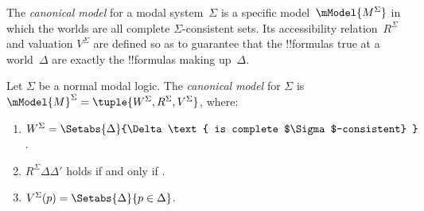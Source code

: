 \documentclass[../../../include/open-logic-section]{subfiles}
\begin{document}


The \emph{canonical model} for a modal system~$\Sigma$ is a specific
model~$\mModel{M^\Sigma}$ in which the worlds are all complete
$\Sigma$-consistent sets. Its accessibility relation~$R^\Sigma$ and
valuation $V^\Sigma$ are defined so as to guarantee that the
!!{formula}s true at a world~$\Delta$ are exactly the !!{formula}s
making up~$\Delta$.

\begin{defn}
  Let $\Sigma$ be a normal modal logic. The \emph{canonical model} for
  $\Sigma$ is $\mModel{M}^\Sigma = \tuple{W^\Sigma, R^\Sigma,
    V^\Sigma}$, where:
  \begin{enumerate}
  \item $W^\Sigma = \Setabs{ \Delta }{\Delta \text{
      is complete $\Sigma$-consistent} }$.
  \item $R^\Sigma \Delta\Delta'$ holds if and only if
    .
  \item $V^\Sigma(p) = \Setabs{\Delta}{p \in \Delta}$.
  \end{enumerate}
\end{defn}
\end{document}
